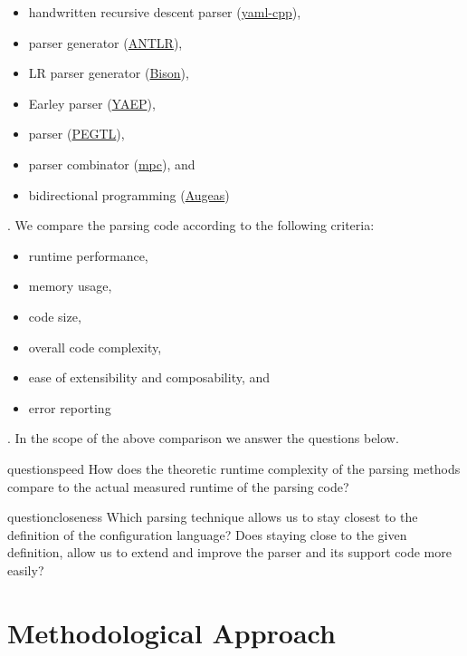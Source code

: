 \begin{itemize}
  \item handwritten recursive descent parser (\href{https://github.com/jbeder/yaml-cpp}{yaml-cpp}),
  \item {} parser generator (\href{http://www.antlr.org}{ANTLR}),
  \item LR parser generator (\href{https://www.gnu.org/software/bison}{Bison}),
  \item Earley parser (\href{https://github.com/vnmakarov/yaep}{YAEP}),
  \item {} parser (\href{https://github.com/taocpp/PEGTL}{PEGTL}),
  \item parser combinator (\href{https://github.com/orangeduck/mpc}{mpc}), and
  \item bidirectional programming (\href{http://augeas.net}{Augeas})
\end{itemize}

. We compare the parsing code according to the following criteria:

\begin{itemize}
  \item runtime performance,
  \item memory usage,
  \item code size,
  \item overall code complexity,
  \item ease of extensibility and composability, and
  \item error reporting
\end{itemize}

. In the scope of the above comparison we answer the questions below.

\begin{restatable}{question}{speed}
  \label{que:speed}
  How does the theoretic runtime complexity of the parsing methods compare to the actual measured runtime of the parsing code?
\end{restatable}

\begin{restatable}{question}{closeness}
  \label{que:closeness}
  Which parsing technique allows us to stay closest to the definition of the configuration language? Does staying close to the given definition,
  allow us to extend and improve the parser and its support code more easily?
\end{restatable}

\section{Methodological Approach}

